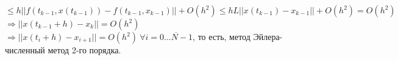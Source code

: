 \documentclass[a4paper,14pt]{article}
\begin{document}
$\leq h||f(t_{k-1},x(t_{k-1}))-f(t_{k-1},x_{k-1})||+O(h^2)\leq hL||x(t_{k-1})-x_{k-1}||+O(h^2)=O(h^2)$\newline
$\Rightarrow ||x(t_{k-1}+h)-x_{k}||=O(h^2)$\newline
$\Rightarrow ||x(t_i+h)-x_{i+1}||=O(h^2) \ \forall i=\overline{0...N-1}$, то есть, метод Эйлера- численный метод 2-го порядка.\newline
\newpage
\end{document}

